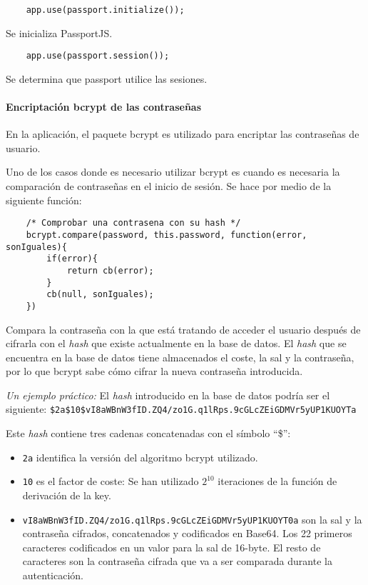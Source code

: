\medskip
\begin{lstlisting}
	app.use(passport.initialize());
\end{lstlisting}


Se inicializa PassportJS.


\medskip
\begin{lstlisting}
	app.use(passport.session());
\end{lstlisting}


Se determina que passport utilice las sesiones.


\paragraph*{Encriptación bcrypt de las contraseñas}


En la aplicación, el paquete bcrypt es utilizado para encriptar las contraseñas de usuario.


Uno de los casos donde es necesario utilizar bcrypt es cuando es necesaria la comparación de contraseñas en el inicio de sesión. Se hace por medio de la siguiente función:


\medskip
\begin{lstlisting}
	/* Comprobar una contrasena con su hash */ 
	bcrypt.compare(password, this.password, function(error, sonIguales){ 
		if(error){ 
			return cb(error); 
		} 
		cb(null, sonIguales); 
	}) 
\end{lstlisting}

Compara la contraseña con la que está tratando de acceder el usuario después de cifrarla con el \textit{hash} que existe actualmente en la base de datos. El \textit{hash} que se encuentra en la base de datos tiene almacenados el coste, la sal y la contraseña, por lo que bcrypt sabe cómo cifrar la nueva contraseña introducida.


\textit{Un ejemplo práctico\cite{bcrypt_ejemplo}:}
El \textit{hash} introducido en la base de datos podría ser el siguiente:
\texttt{\$2a\$10\$vI8aWBnW3fID.ZQ4/zo1G.q1lRps.9cGLcZEiGDMVr5yUP1KUOYTa}


Este \textit{hash} contiene tres cadenas concatenadas con el símbolo ``\$'':
\begin{itemize}
\item \texttt{2a} identifica la versión del algoritmo bcrypt utilizado.
\item \texttt{10} es el factor de coste: Se han utilizado $2^{10}$ iteraciones de la función de derivación de la key.
\item \texttt{vI8aWBnW3fID.ZQ4/zo1G.q1lRps.9cGLcZEiGDMVr5yUP1KUOYT0a} son la sal y la contraseña cifrados, concatenados y codificados en Base64. Los 22 primeros caracteres codificados en un valor para la sal de 16-byte. El resto de caracteres son la contraseña cifrada que va a ser comparada durante la autenticación.
\end{itemize}


